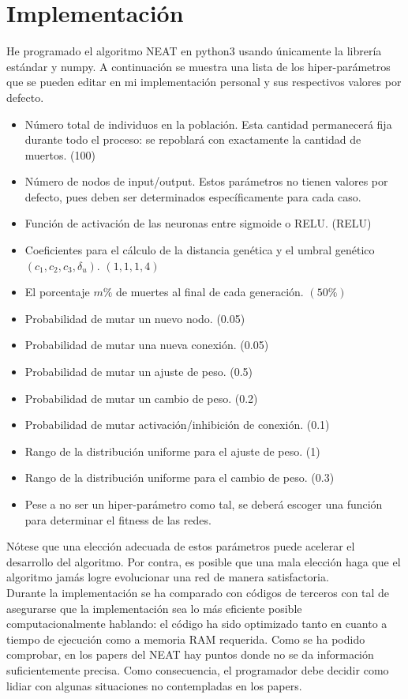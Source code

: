 \documentclass{article}
\begin{document}
\section{Implementación}
He programado el algoritmo NEAT en python3 usando únicamente la librería estándar y numpy. A continuación se muestra una lista de los hiper-parámetros que se pueden editar en mi implementación personal y sus respectivos valores por defecto.
\begin{itemize}
\item Número total de individuos en la población. Esta cantidad permanecerá fija durante todo el proceso: se repoblará con exactamente la cantidad de muertos. (100)
\item Número de nodos de input/output. Estos parámetros no tienen valores por defecto, pues deben ser determinados específicamente para cada caso.
\item Función de activación de las neuronas entre sigmoide o RELU. (RELU)
\item Coeficientes para el cálculo de la distancia genética y el umbral genético $(c_1,c_2,c_3,\delta_u) $. $(1,1,1,4) $
\item El porcentaje $m\%$ de muertes al final de cada generación. $(50\%) $
\item Probabilidad de mutar un nuevo nodo. (0.05)
\item Probabilidad de mutar una nueva conexión. (0.05)
\item Probabilidad de mutar un ajuste de peso. (0.5)
\item Probabilidad de mutar un cambio de peso. (0.2)
\item Probabilidad de mutar activación/inhibición de conexión. (0.1)
\item Rango de la distribución uniforme para el ajuste de peso. (1)
\item Rango de la distribución uniforme para el cambio de peso. (0.3)
\item Pese a no ser un hiper-parámetro como tal, se deberá escoger una función para determinar el fitness de las redes.

\end{itemize}
Nótese que una elección adecuada de estos parámetros puede acelerar el desarrollo del algoritmo. Por contra, es posible que una mala elección haga que el algoritmo jamás logre evolucionar una red de manera satisfactoria.\\

Durante la implementación se ha comparado con códigos de terceros con tal de asegurarse que la implementación sea lo más eficiente posible computacionalmente hablando: el código ha sido optimizado tanto en cuanto a tiempo de ejecución como a memoria RAM requerida. Como se ha podido comprobar, en los papers del NEAT hay puntos donde no se da información suficientemente precisa. Como consecuencia, el programador debe decidir como lidiar con algunas situaciones no contempladas en los papers.\\
\end{document}
